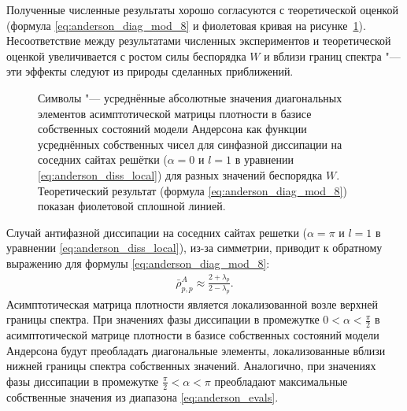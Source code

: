 Полученные численные результаты хорошо согласуются с теоретической оценкой (формула \cref{eq:anderson_diag_mod_8} и фиолетовая кривая на рисунке~\cref{fig:anderson_rho_nn_1}). 
Несоответствие между результатами численных экспериментов и теоретической оценкой увеличивается с ростом силы беспорядка \(W\) и вблизи границ спектра "--- эти эффекты следуют из природы сделанных приближений.
\begin{figure}[ht]
	\caption[Усреднённые диагональные элементы матрицы плотности с локализацией Андерсона и теоретической оценкой]{
		Символы "--- усреднённые абсолютные значения диагональных элементов асимптотической матрицы плотности в базисе собственных состояний модели Андерсона как функции усреднённых собственных чисел для синфазной диссипации на соседних сайтах решётки (\(\alpha=0\) и \(l=1\) в уравнении \cref{eq:anderson_diss_local}) для разных значений беспорядка \(W\). Теоретический результат (формула \cref{eq:anderson_diag_mod_8}) показан фиолетовой сплошной линией.
	}
	\label{fig:anderson_rho_nn_1}
\end{figure}

Случай антифазной диссипации на соседних сайтах решетки (\(\alpha=\pi\) и \(l=1\) в уравнении \cref{eq:anderson_diss_local}), из-за симметрии, приводит к обратному выражению для формулы \cref{eq:anderson_diag_mod_8}:
\begin{equation}
	\label{eq:anderson_diag_mod_9}
	\begin{gathered}
		\bar{\rho}^A_{p,p} \approx \frac{2+\lambda_p}{2-\lambda_p}.
	\end{gathered}
\end{equation}
Асимптотическая матрица плотности является локализованной возле верхней границы спектра. 
При значениях фазы диссипации в промежутке \(0 < \alpha < \frac{\pi}{2}\)  в асимптотической матрице плотности в базисе собственных состояний модели Андерсона будут преобладать диагональные элементы, локализованные вблизи нижней границы спектра собственных значений. Аналогично, при значениях фазы диссипации в промежутке \(\frac{\pi}{2} < \alpha < \pi\) преобладают максимальные собственные значения из диапазона \cref{eq:anderson_evals}.

